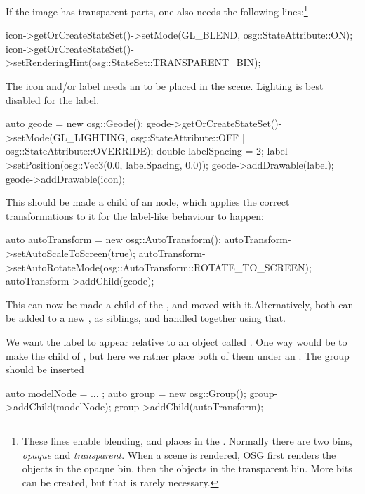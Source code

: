 If the image has transparent parts, one also needs the following lines:\footnote{These lines
enable blending, and places  in the . Normally there are
two bins, \textit{opaque} and \textit{transparent}. When a scene is rendered, OSG first
renders the objects in the opaque bin, then the objects in the transparent bin. More bits
can be created, but that is rarely necessary.}

\begin{cpp}
icon->getOrCreateStateSet()->setMode(GL_BLEND, osg::StateAttribute::ON);
icon->getOrCreateStateSet()->setRenderingHint(osg::StateSet::TRANSPARENT_BIN);
\end{cpp}

The icon and/or label needs an  to be placed in the scene.
Lighting is best disabled for the label.

\begin{cpp}
auto geode = new osg::Geode();
geode->getOrCreateStateSet()->setMode(GL_LIGHTING,
            osg::StateAttribute::OFF | osg::StateAttribute::OVERRIDE);
double labelSpacing = 2;
label->setPosition(osg::Vec3(0.0, labelSpacing, 0.0));
geode->addDrawable(label);
geode->addDrawable(icon);
\end{cpp}

This  should be made a child of an 
node, which applies the correct transformations to it for the label-like behaviour
to happen:

\begin{cpp}
auto autoTransform = new osg::AutoTransform();
autoTransform->setAutoScaleToScreen(true);
autoTransform->setAutoRotateMode(osg::AutoTransform::ROTATE_TO_SCREEN);
autoTransform->addChild(geode);
\end{cpp}

This  can now be made a child of the ,
and moved with it.Alternatively, both can be added to a new ,
as siblings, and handled together using that.

We want the label to appear relative to an object called .
One way would be to make  the child of ,
but here we rather place both of them under an . The group should
be inserted

\begin{cpp}
auto modelNode = ... ;
auto group = new osg::Group();
group->addChild(modelNode);
group->addChild(autoTransform);
\end{cpp}

